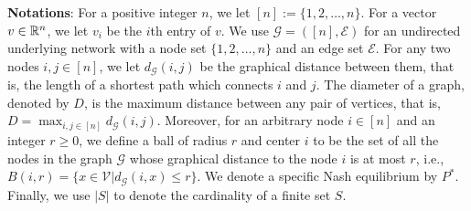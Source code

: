 \textbf{Notations}:
For a positive integer $n$, we let $[n]:=\{1,2,\ldots,n\}$. For a vector $v\in \mathbb{R}^n$, we let $v_i$ be the $i$th entry of $v$. We use $\mathcal{G}=([n], \mathcal{E})$ for an undirected underlying network with a node set $\{1,2,\ldots,n\}$ and an edge set $\mathcal{E}$. For any two nodes $i, j \in [n]$, we let $d_{\mathcal{G}}(i,j)$ be the graphical distance between them, that is, the length of a shortest path which connects $i$ and $j$. The diameter of a graph, denoted by $D$, is the maximum distance between any pair of vertices, that is, $D=\max_{i,j \in [n]} d_{\mathcal{G}}(i,j)$. Moreover, for an arbitrary node $i\in [n]$ and an integer $r\ge 0$, we define a ball of radius $r$ and center $i$ to be the set of all the nodes in the graph $\mathcal{G}$ whose graphical distance to the node $i$ is at most $r$, i.e., $B(i,r)=\{x\in \mathcal{V}| d_{\mathcal{G}}(i,x)\leq r\}$. We denote a specific Nash equilibrium by $P^*$. Finally, we use $|S|$ to denote the cardinality of a finite set $S$.
